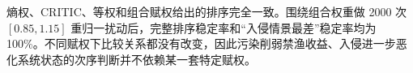 熵权、CRITIC、等权和组合赋权给出的排序完全一致。围绕组合权重做 2000 次 $[0.85,1.15]$ 重归一扰动后，完整排序稳定率和“入侵情景最差”稳定率均为 100\%。不同赋权下比较关系都没有改变，因此污染削弱禁渔收益、入侵进一步恶化系统状态的次序判断并不依赖某一套特定赋权。
